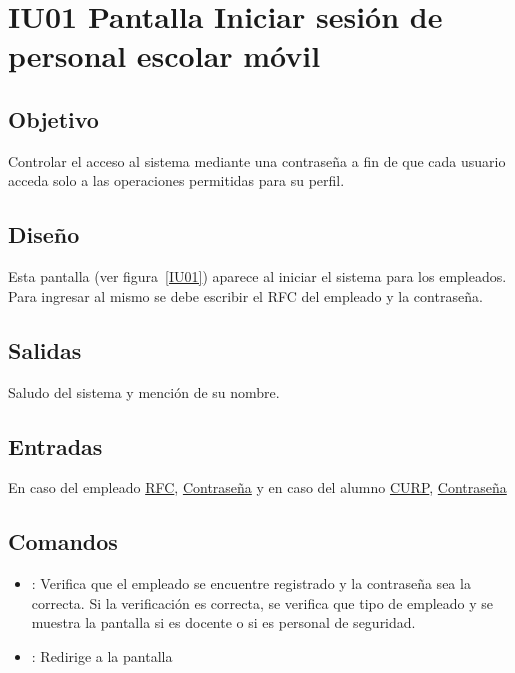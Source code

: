 
\section{IU01 Pantalla Iniciar sesión de personal escolar móvil} 

\subsection{Objetivo}
	Controlar el acceso al sistema mediante una contraseña a fin de que cada usuario acceda solo a las operaciones permitidas para su perfil.

\subsection{Diseño}
	Esta pantalla  (ver figura~\ref{IU01}) aparece al iniciar el sistema para los empleados. Para ingresar al mismo se debe escribir el RFC del empleado y la contraseña. 


\subsection{Salidas}

Saludo del sistema y mención de su nombre.

\subsection{Entradas}
En caso del empleado \hyperlink{Empleado.RFC}{RFC}, \hyperlink{Empleado.Contraseña}{Contraseña} y en caso del alumno \hyperlink{Alumn.CURP}{CURP}, \hyperlink{Alumno.Contraseña}{Contraseña} 

\subsection{Comandos}
\begin{itemize}
	\item {}: Verifica que el empleado se encuentre registrado y la contraseña sea la correcta. Si la verificación es correcta, se verifica que tipo de empleado y se muestra la pantalla  si es docente o  si es personal de seguridad.
	
	\item {}: Redirige a la pantalla 
	
\end{itemize}

